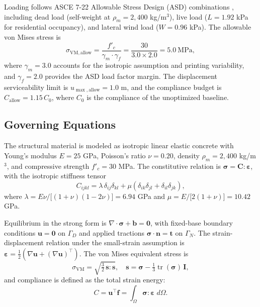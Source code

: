 \documentclass[11pt]{article}
\theoremstyle{plain}
\theoremstyle{definition}
\theoremstyle{remark}
\begin{document}
Loading follows ASCE 7-22 Allowable Stress Design (ASD) combinations \cite{asce2022}, including dead load (self-weight at $\rho_m = 2{,}400$ kg/m$^3$), live load ($L = 1.92$ kPa for residential occupancy), and lateral wind load ($W = 0.96$ kPa). The allowable von Mises stress is
\begin{equation}\label{eq:vmallow}
\sigma_{\mathrm{VM,allow}} = \frac{f'_c}{\gamma_m \cdot \gamma_f} = \frac{30}{3.0 \times 2.0} = 5.0~\text{MPa},
\end{equation}
where $\gamma_m = 3.0$ accounts for the isotropic assumption and printing variability, and $\gamma_f = 2.0$ provides the ASD load factor margin. The displacement serviceability limit is $u_{\max,\mathrm{allow}} = 1.0$ m, and the compliance budget is $C_{\mathrm{allow}} = 1.15\,C_0$, where $C_0$ is the compliance of the unoptimized baseline.

\subsection{Governing Equations}
\label{sec:governing}

The structural material is modeled as isotropic linear elastic concrete with Young's modulus $E = 25$ GPa, Poisson's ratio $\nu = 0.20$, density $\rho_m = 2{,}400$ kg/m$^3$, and compressive strength $f'_c = 30$ MPa. The constitutive relation is $\boldsymbol{\sigma} = \mathbf{C} : \boldsymbol{\varepsilon}$, with the isotropic stiffness tensor
\begin{equation}\label{eq:stiffness}
C_{ijkl} = \lambda\,\delta_{ij}\delta_{kl} + \mu\left(\delta_{ik}\delta_{jl} + \delta_{il}\delta_{jk}\right),
\end{equation}
where $\lambda = E\nu/\bigl[(1+\nu)(1-2\nu)\bigr] = 6.94$ GPa and $\mu = E/\bigl[2(1+\nu)\bigr] = 10.42$ GPa.

Equilibrium in the strong form is $\nabla \cdot \boldsymbol{\sigma} + \mathbf{b} = \mathbf{0}$, with fixed-base boundary conditions $\mathbf{u} = \mathbf{0}$ on $\Gamma_D$ and applied tractions $\boldsymbol{\sigma} \cdot \mathbf{n} = \mathbf{t}$ on $\Gamma_N$. The strain-displacement relation under the small-strain assumption is $\boldsymbol{\varepsilon} = \frac{1}{2}(\nabla\mathbf{u} + (\nabla\mathbf{u})^\top)$. The von Mises equivalent stress is
\begin{equation}\label{eq:vonmises}
\sigma_{\mathrm{VM}} = \sqrt{\tfrac{3}{2}\,\mathbf{s}:\mathbf{s}}, \quad \mathbf{s} = \boldsymbol{\sigma} - \tfrac{1}{3}\operatorname{tr}(\boldsymbol{\sigma})\,\mathbf{I},
\end{equation}
and compliance is defined as the total strain energy:
\begin{equation}\label{eq:compliance}
C = \mathbf{u}^\top\mathbf{f} = \int_\Omega \boldsymbol{\sigma} : \boldsymbol{\varepsilon}\;d\Omega.
\end{equation}
\end{document}
